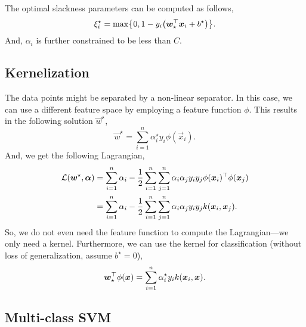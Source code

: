 The optimal slackness parameters can be computed as follows, \[
    \xi_i^\star = \max \lft\{ 0, 1 - y_i \lft( \transpose{\vec{w}_\star} \vec{x}_i + b^\star \rgt) \rgt\}.
\]
And, $\alpha_i$ is further constrained to be less than $C$.

\subsection{Kernelization}

The data points might be separated by a non-linear separator. In this case, we can use a different
feature space by employing a feature function $\phi$. This results in the following solution
$\vec{w}^\star$, \[
    \vec{w}^\star = \sum_{i=1}^{n} \alpha_i^\star y_i \phi(\vec{x}_i).
\]
And, we get the following Lagrangian,
\begin{align*}
    \mathcal{L}(\bm{w}^\star, \bm{\alpha}) & = \sum_{i=1}^{n} \alpha_i - \frac{1}{2} \sum_{i=1}^{n} \sum_{j=1}^{n} \alpha_i \alpha_j y_i y_j \phi(\bm{x}_i)^\top \phi(\bm{x}_j) \\
                                             & = \sum_{i=1}^{n} \alpha_i - \frac{1}{2} \sum_{i=1}^{n} \sum_{j=1}^{n} \alpha_i \alpha_j y_i y_j k(\bm{x}_i, \bm{x}_j).
\end{align*}
So, we do not even need the feature function to compute the Lagrangian---we only need a kernel.
Furthermore, we can use the kernel for classification (without loss of generalization, assume
$b^\star = 0$), \[
    \bm{w}_\star^\top \phi(\bm{x}) = \sum_{i=1}^{n} \alpha_i^\star y_i k(\bm{x}_i, \bm{x}).
\]

\subsection{Multi-class SVM}

